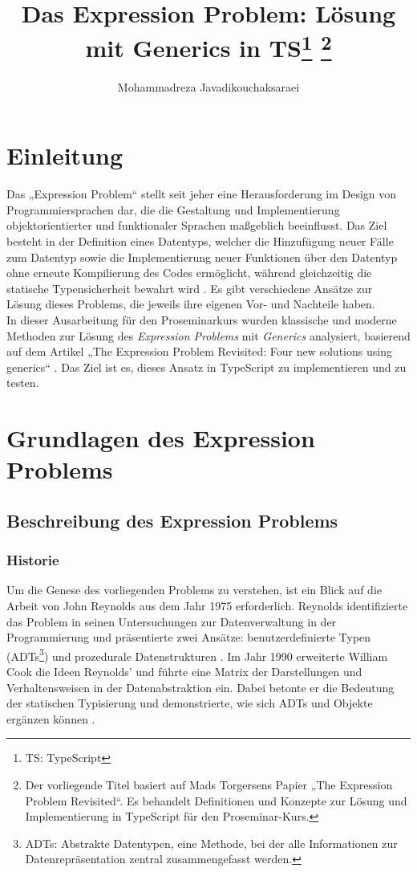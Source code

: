 \documentclass{easychair}
\title{Das Expression Problem: Lösung mit Generics in TS\footnote{TS: TypeScript}
\thanks{Der vorliegende Titel basiert auf Mads Torgersens Papier „The Expression Problem Revisited“. Es behandelt Definitionen und Konzepte zur Lösung und Implementierung in TypeScript für den Proseminar-Kurs.}}
\author{Mohammadreza Javadikouchaksaraei}
\institute{
  Technische Universität Dortmund\\
  Informatik Student mit Matrikelnummer 234019\\
  \email{mohammadreza.javadikouchaksaraei@tu-dortmund.de}
}
\begin{document}
\maketitle

\setcounter{tocdepth}{2}
{\small
\tableofcontents}

\newpage

\section{Einleitung}
Das „Expression Problem“ stellt seit jeher eine Herausforderung im Design von Programmiersprachen dar, die die Gestaltung und Implementierung objektorientierter und funktionaler Sprachen maßgeblich beeinflusst. Das Ziel besteht in der Definition eines Datentyps, welcher die Hinzufügung neuer Fälle zum Datentyp sowie die Implementierung neuer Funktionen über den Datentyp ohne erneute Kompilierung des Codes ermöglicht, während gleichzeitig die statische Typensicherheit bewahrt wird \cite{wadler1998expression}. Es gibt verschiedene Ansätze zur Lösung dieses Problems, die jeweils ihre eigenen Vor- und Nachteile haben.\\

In dieser Ausarbeitung für den Proseminarkurs wurden klassische und moderne Methoden zur Lösung des \textit{Expression Problems} mit \textit{Generics} analysiert, basierend auf dem Artikel „The Expression Problem Revisited: Four new solutions using generics“ \cite{torgersen2004expression}. Das Ziel ist es, dieses Ansatz in TypeScript zu implementieren und zu testen.

\section{Grundlagen des Expression Problems}
  \subsection{Beschreibung des Expression Problems}
  \subsubsection{Historie}
Um die Genese des vorliegenden Problems zu verstehen, ist ein Blick auf die Arbeit von John Reynolds aus dem Jahr 1975 erforderlich. Reynolds identifizierte das Problem in seinen Untersuchungen zur Datenverwaltung in der Programmierung und präsentierte zwei Ansätze: benutzerdefinierte Typen (ADTs\footnote{ADTs: Abstrakte Datentypen, eine Methode, bei der alle Informationen zur Datenrepräsentation zentral zusammengefasst werden.}) und prozedurale Datenstrukturen \cite{Reynolds1978}. Im Jahr 1990 erweiterte William Cook die Ideen Reynolds' und führte eine Matrix der Darstellungen und Verhaltensweisen in der Datenabstraktion ein. Dabei betonte er die Bedeutung der statischen Typisierung und demonstrierte, wie sich ADTs und Objekte ergänzen können \cite{Cook1990}.\\
\end{document}
